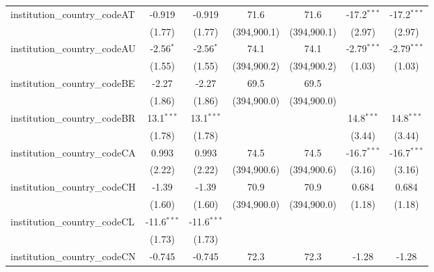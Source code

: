 \begin{tabular}{lcccccc}
   institution\_country\_codeAT          & -0.919        & -0.919        & 71.6          & 71.6          & -17.2$^{***}$ & -17.2$^{***}$\\   
                                         & (1.77)        & (1.77)        & (394,900.1)   & (394,900.1)   & (2.97)        & (2.97)\\   
   institution\_country\_codeAU          & -2.56$^{*}$   & -2.56$^{*}$   & 74.1          & 74.1          & -2.79$^{***}$ & -2.79$^{***}$\\   
                                         & (1.55)        & (1.55)        & (394,900.2)   & (394,900.2)   & (1.03)        & (1.03)\\   
   institution\_country\_codeBE          & -2.27         & -2.27         & 69.5          & 69.5          &               &   \\   
                                         & (1.86)        & (1.86)        & (394,900.0)   & (394,900.0)   &               &   \\   
   institution\_country\_codeBR          & 13.1$^{***}$  & 13.1$^{***}$  &               &               & 14.8$^{***}$  & 14.8$^{***}$\\   
                                         & (1.78)        & (1.78)        &               &               & (3.44)        & (3.44)\\   
   institution\_country\_codeCA          & 0.993         & 0.993         & 74.5          & 74.5          & -16.7$^{***}$ & -16.7$^{***}$\\   
                                         & (2.22)        & (2.22)        & (394,900.6)   & (394,900.6)   & (3.16)        & (3.16)\\   
   institution\_country\_codeCH          & -1.39         & -1.39         & 70.9          & 70.9          & 0.684         & 0.684\\   
                                         & (1.60)        & (1.60)        & (394,900.0)   & (394,900.0)   & (1.18)        & (1.18)\\   
   institution\_country\_codeCL          & -11.6$^{***}$ & -11.6$^{***}$ &               &               &               &   \\   
                                         & (1.73)        & (1.73)        &               &               &               &   \\   
   institution\_country\_codeCN          & -0.745        & -0.745        & 72.3          & 72.3          & -1.28         & -1.28\\   

\end{tabular}
